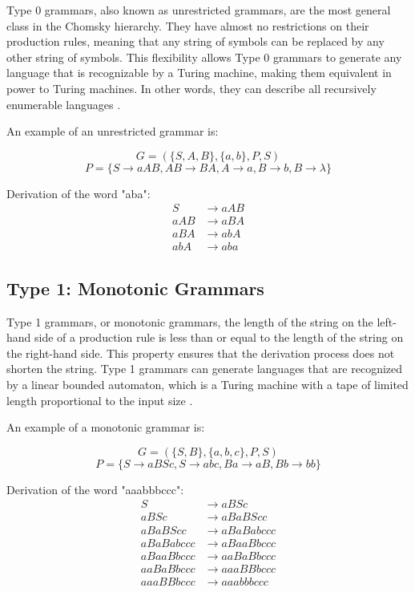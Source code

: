 Type 0 grammars, also known as unrestricted grammars, are the most general class in the Chomsky hierarchy. They have almost no restrictions on their production rules, meaning that any string of symbols can be replaced by any other string of symbols. This flexibility allows Type 0 grammars to generate any language that is recognizable by a Turing machine, making them equivalent in power to Turing machines. In other words, they can describe all recursively enumerable languages \cite{cit9}.

An example of an unrestricted grammar is:


\[ G = ( \{S, A, B\}, \{a, b\}, P, S ) \]
\[ P = \{ S \rightarrow aAB, AB \rightarrow BA, A \rightarrow a, B \rightarrow b, B \rightarrow \lambda \} \]

Derivation of the word "aba":
\[
\begin{aligned}
S &\rightarrow aAB \\
aAB &\rightarrow aBA \\
aBA &\rightarrow abA \\
abA &\rightarrow aba
\end{aligned}
\]

\subsection{Type 1: Monotonic Grammars}

Type 1 grammars, or monotonic grammars, 
the length of the string on the left-hand side of a 
production rule is less than or equal to the length of the 
string on the right-hand side. This property ensures that the 
derivation process does not shorten the string. Type 1 grammars 
can generate languages 
that are recognized by a linear bounded automaton, which is a 
Turing machine with a tape of limited length 
proportional to the input size \cite{cit9}. 

An example of a monotonic grammar is:

\[ G = ( \{S, B \}, \{a, b, c\}, P, S ) \]
\[ P = \{ S \rightarrow aBSc, S \rightarrow abc, Ba \rightarrow aB, Bb \rightarrow bb \} \]


Derivation of the word "aaabbbccc":
\[
\begin{aligned}
S &\rightarrow aBSc \\
aBSc &\rightarrow aBaBScc \\
aBaBScc &\rightarrow aBaBabccc \\
aBaBabccc &\rightarrow aBaaBbccc \\
aBaaBbccc &\rightarrow aaBaBbccc \\
aaBaBbccc &\rightarrow aaaBBbccc \\
aaaBBbccc &\rightarrow aaabbbccc 
\end{aligned}
\]

